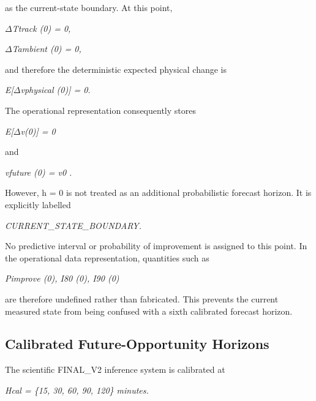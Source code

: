 as the current-state boundary. At this point,

\begin{center}\textit{\ensuremath{\Delta}Ttrack (0) = 0,}\end{center}

\begin{center}\textit{\ensuremath{\Delta}Tambient (0) = 0,}\end{center}

and therefore the deterministic expected physical change is

\begin{center}\textit{E[\ensuremath{\Delta}vphysical (0)] = 0.}\end{center}

The operational representation consequently stores

\begin{center}\textit{E[\ensuremath{\Delta}v(0)] = 0}\end{center}

and

\begin{center}\textit{vfuture (0) = v0 .}\end{center}

However, h = 0 is not treated as an additional probabilistic forecast horizon. It is explicitly labelled

\begin{center}\textit{CURRENT\_STATE\_BOUNDARY.}\end{center}

No predictive interval or probability of improvement is assigned to this point. In the operational data representation, quantities such as

\begin{center}\textit{Pimprove (0),       I80 (0),     I90 (0)}\end{center}

are therefore undefined rather than fabricated. This prevents the current measured state from being confused with a sixth calibrated forecast horizon.

\subsection{Calibrated Future-Opportunity Horizons}
The scientific FINAL\_V2 inference system is calibrated at

\begin{center}\textit{Hcal = \{15, 30, 60, 90, 120\} minutes.}\end{center}

